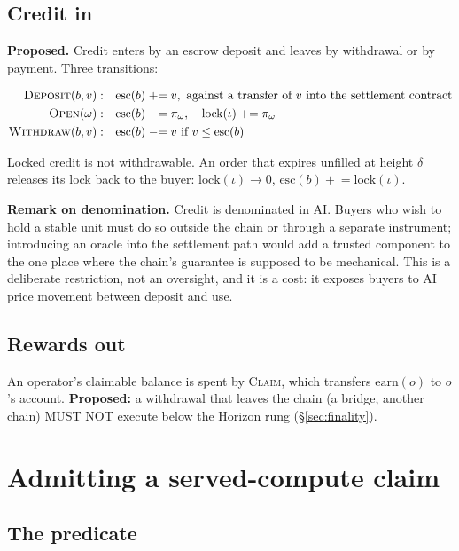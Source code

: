 \documentclass[11pt,a4paper]{article}
\theoremstyle{definition}
\theoremstyle{remark}
\newcommand{\Ord}{\omega}
\begin{document}
\subsection{Credit in}

\textbf{Proposed.} Credit enters by an escrow deposit and leaves by withdrawal
or by payment. Three transitions:

\begin{align*}
\textsc{Deposit}(b, v)&: && \mathrm{esc}(b) \mathrel{+}= v, \text{ against a transfer of } v \text{ into the settlement contract} \\
\textsc{Open}(\Ord)&: && \mathrm{esc}(b) \mathrel{-}= \pi_\Ord,\quad \mathrm{lock}(\iota) \mathrel{+}= \pi_\Ord \\
\textsc{Withdraw}(b, v)&: && \mathrm{esc}(b) \mathrel{-}= v \text{ if } v \le \mathrm{esc}(b)
\end{align*}

Locked credit is not withdrawable. An order that expires unfilled at height
$\delta$ releases its lock back to the buyer:
$\mathrm{lock}(\iota) \to 0$, $\mathrm{esc}(b) \mathrel{+}= \mathrm{lock}(\iota)$.

\textbf{Remark on denomination.} Credit is denominated in AI. Buyers who wish
to hold a stable unit must do so outside the chain or through a separate
instrument; introducing an oracle into the settlement path would add a trusted
component to the one place where the chain's guarantee is supposed to be
mechanical. This is a deliberate restriction, not an oversight, and it is a
cost: it exposes buyers to AI price movement between deposit and use.

\subsection{Rewards out}

An operator's claimable balance is spent by \textsc{Claim}, which transfers
$\mathrm{earn}(o)$ to $o$'s account. \textbf{Proposed:} a withdrawal that
leaves the chain (a bridge, another chain) MUST NOT execute below the Horizon
rung (\S\ref{sec:finality}).

\section{Admitting a served-compute claim}
\label{sec:admission}

\subsection{The predicate}
\end{document}
